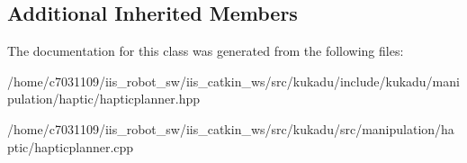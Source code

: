 \subsection*{Additional Inherited Members}


The documentation for this class was generated from the following files\-:\begin{DoxyCompactItemize}
\item 
/home/c7031109/iis\-\_\-robot\-\_\-sw/iis\-\_\-catkin\-\_\-ws/src/kukadu/include/kukadu/manipulation/haptic/hapticplanner.\-hpp\item 
/home/c7031109/iis\-\_\-robot\-\_\-sw/iis\-\_\-catkin\-\_\-ws/src/kukadu/src/manipulation/haptic/hapticplanner.\-cpp\end{DoxyCompactItemize}

